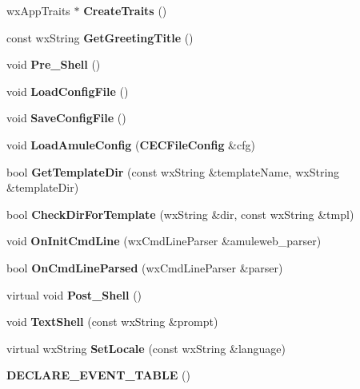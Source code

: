 \begin{DoxyCompactItemize}
\item 
wxAppTraits $\ast$ {\bfseries CreateTraits} ()\label{classCamulewebApp_a290e68372a8635fd4366444517d42429}

\item 
const wxString {\bfseries GetGreetingTitle} ()\label{classCamulewebApp_ae69a752e963488d4f7c37678d06be0ae}

\item 
void {\bfseries Pre\_\-Shell} ()\label{classCamulewebApp_a4cae2a9c8646d160d3bb168efde17297}

\item 
void {\bfseries LoadConfigFile} ()\label{classCamulewebApp_a4574195d2ee0cbf97b87908fa0869053}

\item 
void {\bfseries SaveConfigFile} ()\label{classCamulewebApp_a46f8c72f710a2e6109243dc00e6c032f}

\item 
void {\bfseries LoadAmuleConfig} ({\bf CECFileConfig} \&cfg)\label{classCamulewebApp_a386b6dd09f3006c93778b3610300a78f}

\item 
bool {\bfseries GetTemplateDir} (const wxString \&templateName, wxString \&templateDir)\label{classCamulewebApp_ab995618442ed2c7b694ac8063c21c1d1}

\item 
bool {\bfseries CheckDirForTemplate} (wxString \&dir, const wxString \&tmpl)\label{classCamulewebApp_a585b8a06bd002846393c901ca4369e6d}

\item 
void {\bfseries OnInitCmdLine} (wxCmdLineParser \&amuleweb\_\-parser)\label{classCamulewebApp_a2943adb71247336f64c4b8df4087d2b6}

\item 
bool {\bfseries OnCmdLineParsed} (wxCmdLineParser \&parser)\label{classCamulewebApp_aa774b9201c39e212b1bb14deceb7d7b2}

\item 
virtual void {\bfseries Post\_\-Shell} ()\label{classCamulewebApp_a8446d445100974fee001f5132b0a117f}

\item 
void {\bfseries TextShell} (const wxString \&prompt)\label{classCamulewebApp_a87ce0e08d089d648066b313be3194373}

\item 
virtual wxString {\bfseries SetLocale} (const wxString \&language)\label{classCamulewebApp_aafaffe03ffb2e16af3a3be589195d7bb}

\item 
{\bfseries DECLARE\_\-EVENT\_\-TABLE} ()\label{classCamulewebApp_a8c465fa6333ccbfd62de8dd50af29e2b}

\end{DoxyCompactItemize}
